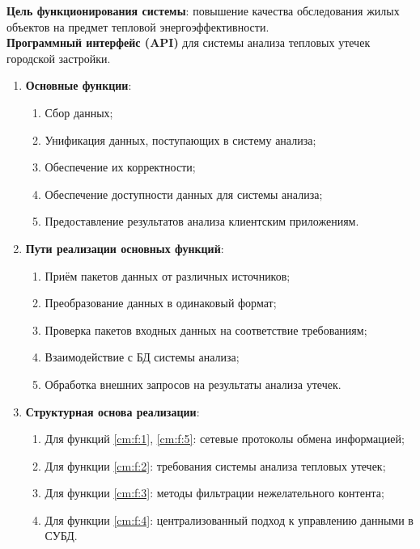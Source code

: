 \textbf{Цель функционирования системы}: повышение качества обследования жилых объектов на предмет тепловой энергоэффективности. \\
 
\textbf{Программный интерфейс (API)} для системы анализа тепловых утечек городской застройки.

\begin{enumerate}
 
	\item \textbf{Основные функции}:

	\begin{enumerate}[label=\labelenumi.\arabic*]
		\item Сбор данных; \label{cm:f:1}
		\item Унификация данных, поступающих в систему анализа; \label{cm:f:2}
		\item Обеспечение их корректности; \label{cm:f:3}
		\item Обеспечение доступности данных для системы анализа; \label{cm:f:4}
		\item Предоставление результатов анализа клиентским приложениям. \label{cm:f:5}
	\end{enumerate}

	\item \textbf{Пути реализации основных функций}:

	\begin{enumerate}
		\item Приём пакетов данных от различных источников;
		\item Преобразование данных в одинаковый формат;
		\item Проверка пакетов входных данных на соответствие требованиям;
		\item Взаимодействие с БД системы анализа;
		\item Обработка внешних запросов на результаты анализа утечек.
	\end{enumerate}

	\item \textbf{Структурная основа реализации}:

	\begin{enumerate}
		\item Для функций \ref{cm:f:1}, \ref{cm:f:5}: сетевые протоколы обмена информацией;
		\item Для функции \ref{cm:f:2}: требования системы анализа тепловых утечек;
		\item Для функции \ref{cm:f:3}: методы фильтрации нежелательного контента;
		\item Для функции \ref{cm:f:4}: централизованный подход к управлению данными в СУБД.
	\end{enumerate}


\end{enumerate}
